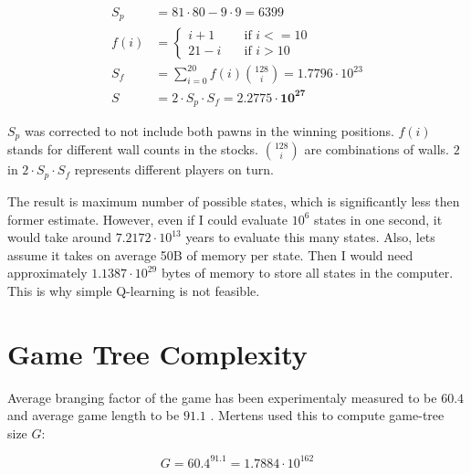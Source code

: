 \begin{center}
  \vspace*{-1.30cm}
  \begin{equation}
    \label{eqn:myestimate}
    \begin{aligned}
      S_p &= 81 {\cdot} 80 - 9 {\cdot} 9 = 6399\\[-0.20cm]
      f(i)\!&=\! \begin{cases}
        i + 1  & \quad \text{if } i <= 10 \\[-0.30cm]
        21 - i & \quad \text{if } i > 10
      \end{cases}\\
      S_f\! &=\! \sum_{i=0}^{20} f(i){128 \choose i} = 1.7796 {\cdot} 10^{23}
      \\
      S &= 2 {\cdot} S_p {\cdot} S_f = \mathbf{2.2775{\cdot}10^{27}}
    \end{aligned}
  \end{equation}
  \vspace*{-1.15cm}
\end{center}

$S_p$ was corrected to not include both pawns in the winning positions.
$f(i)$ %
stands for different wall counts in the stocks.
${128 \choose i}$ are combinations of walls.
$2$ in $2{\cdot} S_p {\cdot} S_f$ represents different players on turn.

The result is maximum number of possible states, which is significantly
less then former estimate. However, even if I could evaluate $10^{6}$
states in one second, it would take around $7.2172{\cdot}10^{13}$ years to
evaluate this many states. Also, lets assume it takes on average 50B
of memory per state. Then I would need approximately
$1.1387{\cdot}10^{29}$ bytes of memory to store all states in the
computer. This is why simple Q-learning is not feasible.

\section{Game Tree Complexity}
Average branging factor of the game has been experimentaly measured to be
$60.4$ and average game length to be $91.1$ \cite{glendenning}.
Mertens \cite{mertens} used this to compute game-tree size $G$:
\begin{center}
  \vspace*{-1.30cm}
  \begin{equation}
    \label{eqn:mgtc}
    G = 60.4^{91.1} = 1.7884{\cdot}10^{162}
  \end{equation}
  \vspace*{-1.30cm}
\end{center}

